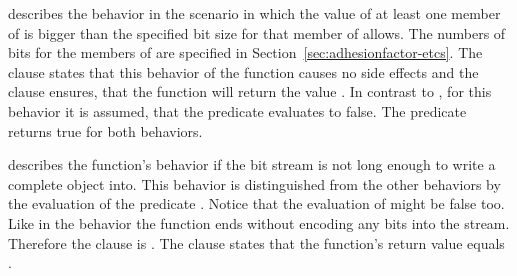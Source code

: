  describes the behavior in
the scenario in which the value of at least one
member of  is bigger than the specified
bit size for that member of
 allows.
The numbers of bits for the members of
 are specified in
Section~\ref{sec:adhesionfactor-etcs}.
The  clause states that this behavior
of the function causes no side effects and
the  clause ensures, that the
function will return the value .
In contrast to ,
for this behavior it is assumed, that the
 predicate evaluates
to false.
The 
predicate returns true for both behaviors.

 describes the function's
behavior if the bit stream is not long enough to
write a complete  object
into. 
This behavior is distinguished from the other
behaviors by the evaluation of the predicate
.
Notice that the evaluation of 
might be false too.
Like in the  behavior the function
ends without encoding any bits into the stream.
Therefore the  clause is \inl{\\nothing}.
The  clause states that the function's
return value equals .

